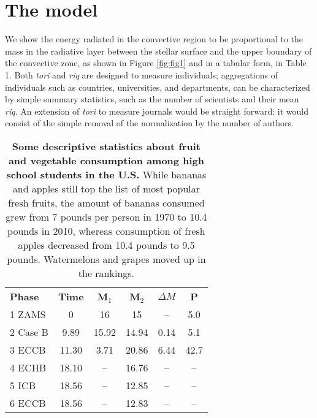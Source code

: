 \section{The model}

We show the energy radiated in the convective region to be proportional to the mass in the radiative layer between the stellar surface and the upper boundary of the convective zone, as shown in Figure \ref{fig:fig1} and in a tabular form, in Table 1. Both {\it tori} and {\it riq} are designed to measure individuals; aggregations of individuals such as countries, universities, and departments, can be characterized by simple summary statistics, such as the number of scientists and their mean {\it riq}. An extension of {\it tori} to measure journals would be straight forward: it would consist of the simple removal of the normalization by the number of authors.  

\begin{table}
\begin{tabular}{lccccc}
\hline
\textbf{Phase}        & \textbf{Time} & \textbf{M$_1$}  & \textbf{M$_2$} &  \textbf{$\Delta M$} & \textbf{P} \\   
1 ZAMS           & 0      & 16     & 15    & --   & 5.0   \\            
2 Case B       & 9.89   & 15.92  & 14.94 & 0.14 & 5.1   \\
3 ECCB        & 11.30  &  3.71  & 20.86 & 6.44 & 42.7  \\
4 ECHB      & 18.10  & --     & 16.76 &  --  & --    \\
5 ICB       & 18.56  & --     & 12.85 &  --  & --    \\    
6 ECCB      & 18.56  & --     & 12.83 &  --  & --    \\
\hline
\end{tabular}
\caption{\textbf{Some descriptive statistics about fruit and vegetable consumption among high school students in the U.S.} While bananas and apples still top the list of most popular fresh fruits, the amount of bananas consumed grew from 7 pounds per person in 1970 to 10.4 pounds in 2010, whereas consumption of fresh apples decreased from 10.4 pounds to 9.5 pounds. Watermelons and grapes moved up in the rankings.}
\end{table}
